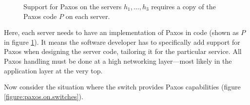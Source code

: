 \begin{figure}[H]
  \centering
  \caption{Support for Paxos on the servers $h_1, \dots, h_3$ requires a
    copy of the Paxos code $P$ on each server.}
  \label{figure:paxos.on.servers}
\end{figure}

Here, each server needs to have an implementation of Paxos in code (shown as $P$
in figure \ref{figure:paxos.on.servers}).
It means the software developer has to specifically add support
for Paxos when designing the server code, tailoring it for the
particular service.  All Paxos handling must be done
at a high networking layer---most likely in the application layer at the
very top.

Now consider the situation where the switch provides Paxos capabilities
(figure \ref{figure:paxos.on.switches}).

